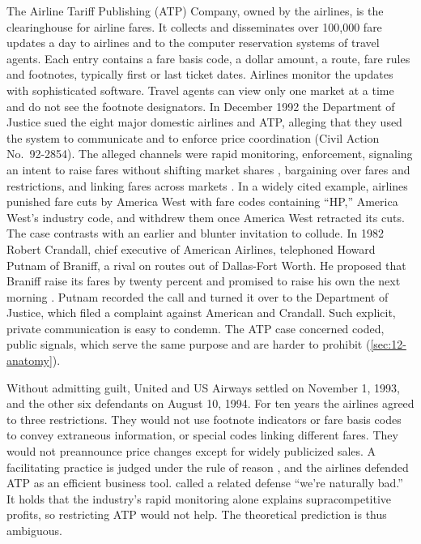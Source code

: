 The Airline Tariff Publishing (ATP) Company, owned by the airlines, is the clearinghouse for airline fares. It
collects and disseminates over 100,000 fare updates a day to airlines and to the computer reservation systems of
travel agents. Each entry contains a fare basis code, a dollar amount, a route, fare rules and footnotes, typically
first or last ticket dates. Airlines monitor the updates with sophisticated software. Travel agents can view only
one market at a time and do not see the footnote designators. In December 1992 the Department of Justice sued the
eight major domestic airlines and ATP, alleging that they used the system to communicate and to enforce price
coordination (Civil Action No.~92-2854). The alleged channels were rapid monitoring, enforcement, signaling an
intent to raise fares without shifting market shares \citep{HoltScheffman1987}, bargaining over fares and
restrictions, and linking fares across markets \citep{BernheimWhinston1990,EvansKessides1994}. In a widely cited
example, airlines punished fare cuts by America West with fare codes containing ``HP,'' America West's industry
code, and withdrew them once America West retracted its cuts. The case contrasts with an earlier and blunter
invitation to collude. In 1982 Robert Crandall, chief executive of American Airlines, telephoned Howard Putnam of
Braniff, a rival on routes out of Dallas-Fort Worth. He proposed that Braniff raise its fares by twenty percent and
promised to raise his own the next morning \citep[pp.~188--189]{AskerNocke2021}. Putnam recorded the call and turned
it over to the Department of Justice, which filed a complaint against American and Crandall. Such explicit,
private communication is easy to condemn. The ATP case concerned coded, public signals, which serve the same
purpose and are harder to prohibit (\cref{sec:12-anatomy}).

Without admitting guilt, United and US Airways settled on November 1, 1993, and the other six defendants on August
10, 1994. For ten years the airlines agreed to three restrictions. They would not use footnote indicators or fare basis
codes to convey extraneous information, or special codes linking different fares. They would not preannounce
price changes except for widely publicized sales. A facilitating practice is judged under the rule of reason \citep[p.~570]{Miller2010}, and the airlines
defended ATP as an efficient business tool. \citet{Hay2000} called a related defense ``we're naturally bad.'' It holds
that the industry's rapid monitoring alone explains supracompetitive profits, so restricting ATP would not help.
The theoretical prediction is thus ambiguous.

